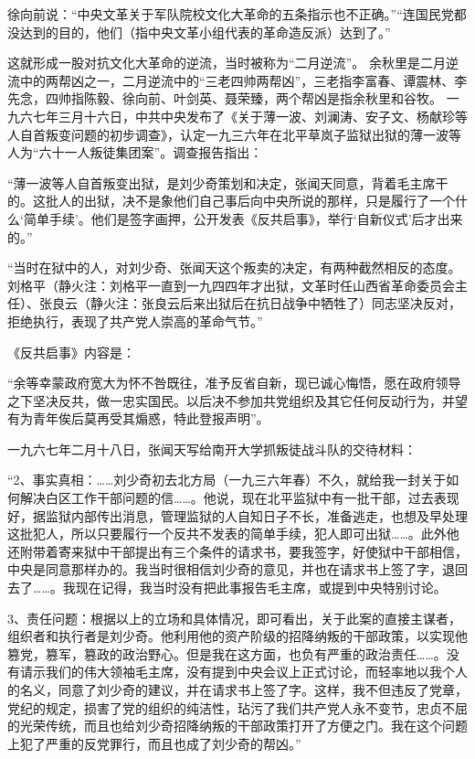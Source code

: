 \begin{maonote}
徐向前说：“中央文革关于军队院校文化大革命的五条指示也不正确。”“连国民党都没达到的目的，他们（指中央文革小组代表的革命造反派）达到了。”

这就形成一股对抗文化大革命的逆流，当时被称为“二月逆流”。
余秋里是二月逆流中的两帮凶之一，二月逆流中的“三老四帅两帮凶”，三老指李富春、谭震林、李先念，四帅指陈毅、徐向前、叶剑英、聂荣臻，两个帮凶是指余秋里和谷牧。
一九六七年三月十六日，中共中央发布了《关于薄一波、刘澜涛、安子文、杨献珍等人自首叛变问题的初步调查》，认定一九三六年在北平草岚子监狱出狱的薄一波等人为“六十一人叛徒集团案”。调查报告指出：

“薄一波等人自首叛变出狱，是刘少奇策划和决定，张闻天同意，背着毛主席干的。这批人的出狱，决不是象他们自己事后向中央所说的那样，只是履行了一个什么‘简单手续’。他们是签字画押，公开发表《反共启事》，举行‘自新仪式’后才出来的。”

“当时在狱中的人，对刘少奇、张闻天这个叛卖的决定，有两种截然相反的态度。刘格平（静火注：刘格平一直到一九四四年才出狱，文革时任山西省革命委员会主任）、张良云（静火注：张良云后来出狱后在抗日战争中牺牲了）同志坚决反对，拒绝执行，表现了共产党人崇高的革命气节。”

《反共启事》内容是：

“余等幸蒙政府宽大为怀不咎既往，准予反省自新，现已诚心悔悟，愿在政府领导之下坚决反共，做一忠实国民。以后决不参加共党组织及其它任何反动行为，并望有为青年俟后莫再受其煽惑，特此登报声明”。

一九六七年二月十八日，张闻天写给南开大学抓叛徒战斗队的交待材料：

“2、事实真相：……刘少奇初去北方局（一九三六年春）不久，就给我一封关于如何解决白区工作干部问题的信……。他说，现在北平监狱中有一批干部，过去表现好，据监狱内部传出消息，管理监狱的人自知日子不长，准备逃走，也想及早处理这批犯人，所以只要履行一个反共不发表的简单手续，犯人即可出狱……。此外他还附带着寄来狱中干部提出有三个条件的请求书，要我签字，好使狱中干部相信，中央是同意那样办的。我当时很相信刘少奇的意见，并也在请求书上签了字，退回去了……。我现在记得，我当时没有把此事报告毛主席，或提到中央特别讨论。

3、责任问题：根据以上的立场和具体情况，即可看出，关于此案的直接主谋者，组织者和执行者是刘少奇。他利用他的资产阶级的招降纳叛的干部政策，以实现他篡党，篡军，篡政的政治野心。但是我在这方面，也负有严重的政治责任……。没有请示我们的伟大领袖毛主席，没有提到中央会议上正式讨论，而轻率地以我个人的名义，同意了刘少奇的建议，并在请求书上签了字。这样，我不但违反了党章，党纪的规定，损害了党的组织的纯洁性，玷污了我们共产党人永不变节，忠贞不屈的光荣传统，而且也给刘少奇招降纳叛的干部政策打开了方便之门。我在这个问题上犯了严重的反党罪行，而且也成了刘少奇的帮凶。”


\end{maonote}

